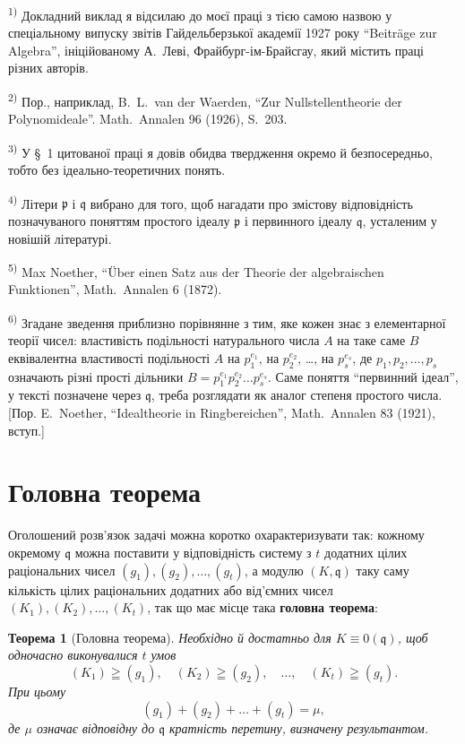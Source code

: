 \documentclass[11pt]{article}
\newcommand{\foreign}[1]{#1}
\theoremstyle{plain}
\newtheorem{satz}{Теорема}
\begin{document}
{\footnotesize
\textsuperscript{1)} Докладний виклад я відсилаю до моєї праці з тією самою
назвою у спеціальному випуску звітів Гайдельберзької академії 1927 року
``Beiträge zur Algebra'', ініційованому А.\ Леві, Фрайбург-ім-Брайсгау, який
містить праці різних авторів.

\textsuperscript{2)} Пор., наприклад, B.\ L.\ van der Waerden, ``Zur Nullstellentheorie der Polynomideale''.
\foreign{Math.\ Annalen} 96 (1926), S.~203.

\textsuperscript{3)} У \S~1 цитованої праці я довів обидва твердження окремо й
безпосередньо, тобто без ідеально-теоретичних понять.

\textsuperscript{4)} Літери $\mathfrak{p}$ і $\mathfrak{q}$ вибрано для того, щоб нагадати про
змістову відповідність позначуваного поняттям простого ідеалу
$\mathfrak{p}$ і первинного ідеалу $\mathfrak{q}$, усталеним у новішій літературі.

\textsuperscript{5)} Max Noether, ``Über einen Satz aus der Theorie der algebraischen Funktionen'',
\foreign{Math.\ Annalen} 6 (1872).

\textsuperscript{6)} Згадане зведення приблизно порівнянне з тим, яке кожен знає з
елементарної теорії чисел: властивість подільності натурального числа
$A$ на таке саме $B$ еквівалентна властивості подільності $A$ на
$p_{1}^{e_{1}}$, на $p_{2}^{e_{2}}$, \ldots, на $p_{s}^{e_{s}}$, де
$p_{1}, p_{2}, \ldots, p_{s}$ означають різні прості дільники
$B = p_{1}^{e_{1}}p_{2}^{e_{2}} \ldots p_{s}^{e_{s}}$. Саме поняття
``первинний ідеал'', у тексті позначене через $\mathfrak{q}$, треба
розглядати як аналог степеня простого числа. [Пор. E.\ Noether,
``Idealtheorie in Ringbereichen'', \foreign{Math.\ Annalen} 83 (1921), вступ.]
}

\newpage
\section*{Головна теорема}

Оголошений розв'язок задачі можна коротко охарактеризувати так:
кожному окремому $\mathfrak{q}$ можна поставити у відповідність
систему з $t$ додатних цілих раціональних чисел
$(g_{1}), (g_{2}), \ldots, (g_{t})$, а модулю $(K, \mathfrak{q})$ таку
саму кількість цілих раціональних додатних або від'ємних чисел
$(K_{1}), (K_{2}), \ldots, (K_{t})$, так що має місце така
\textbf{головна теорема}:

\begin{satz}[Головна теорема]\label{satz:kap-II}
Необхідно й достатньо для $K \equiv 0(\mathfrak{q})$, щоб одночасно
виконувалися $t$ умов
\[
(K_1)\geqq(g_1),\quad (K_2)\geqq(g_2),\quad \ldots,\quad (K_t)\geqq(g_t).
\]
При цьому
\[
(g_1)+(g_2)+\ldots+(g_t)=\mu,
\]
де $\mu$ означає відповідну до $\mathfrak{q}$ кратність перетину,
визначену результантом.
\end{satz}
\end{document}

